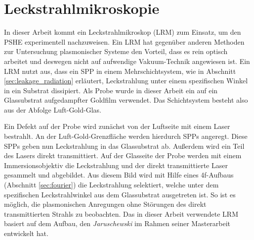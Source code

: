 \documentclass[a4paper, titlepage,  ngerman]{book}
\begin{document}
	\section{Leckstrahlmikroskopie}
	In dieser Arbeit kommt ein Leckstrahlmikroskop (LRM) zum Einsatz, um den PSHE experimentell nachzuweisen. Ein LRM hat gegenüber anderen Methoden zur Untersuchung plasmonischer Systeme den Vorteil, dass es rein optisch arbeitet und deswegen nicht auf aufwendige Vakuum-Technik angewiesen ist. Ein LRM nutzt aus, dass ein SPP in einem Mehrschichtsystem, wie in Abschnitt \ref{sec:leakage_radiation} erläutert, Leckstrahlung unter einem spezifischen Winkel in ein Substrat dissipiert. Als Probe wurde in dieser Arbeit ein auf ein Glassubstrat aufgedampfter Goldfilm verwendet. Das Schichtsystem besteht also aus der Abfolge Luft-Gold-Glas.
	
	Ein Defekt auf der Probe wird zunächst von der Luftseite mit einem Laser bestrahlt. An der Luft-Gold-Grenzfläche werden hierdurch SPPs angeregt. Diese SPPs geben nun Leckstrahlung in das Glassubstrat ab.
	Außerdem wird ein Teil des Lasers direkt transmittiert. Auf der Glasseite der Probe werden mit einem Immersionsobjektiv die Leckstrahlung und der direkt transmittierte Laser gesammelt und abgebildet.	
	Aus diesem Bild wird mit Hilfe eines 4f-Aufbaus (Abschnitt \ref{sec:fourier}) die Leckstrahlung selektiert, welche unter dem spezifischen Leckstrahlwinkel aus dem Glassubstrat ausgetreten ist. So ist es möglich, die plasmonischen Anregungen ohne Störungen des direkt transmittierten Strahls zu beobachten. Das in dieser Arbeit verwendete LRM basiert auf dem Aufbau, den \textit{Jaruschewski} im Rahmen seiner Masterarbeit \cite{Jaruschewski.2020} entwickelt hat.
\end{document}
